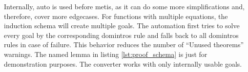 Internally, auto is used before metis, as it can do some more simplifications and, therefore, cover more edgecases.
For functions with multiple equations, the induction schema will create multiple goals.
The automation first tries to solve every goal by the corresponding domintros rule and falls back to all domintros rules in case of failure.
This behavior reduces the number of ``Unused theorems'' warnings.
The named lemma in listing \ref{lst:proof_schema} is just for demonstration purposes.
The converter works with only internally usable goals.

